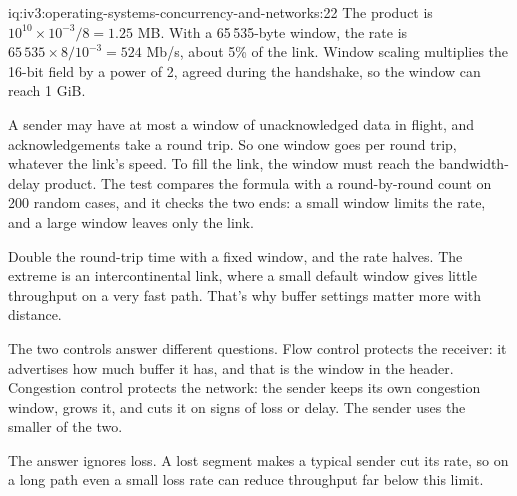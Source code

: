 \begin{solution}{iq:iv3:operating-systems-concurrency-and-networks:22}
The product is $10^{10} \times 10^{-3} / 8 = 1.25$ MB. With a 65\,535-byte window, the rate is $65\,535 \times 8 / 10^{-3} = 524$ Mb/s, about 5\% of the link. Window scaling multiplies the 16-bit field by a power of 2, agreed during the handshake, so the window can reach 1 GiB.
\label{lst:iv3:os:window}

A sender may have at most a window of unacknowledged data in flight, and acknowledgements take a round trip. So one window goes per round trip, whatever the link's speed. To fill the link, the window must reach the bandwidth-delay product. The test compares the formula with a round-by-round count on 200 random cases, and it checks the two ends: a small window limits the rate, and a large window leaves only the link.

Double the round-trip time with a fixed window, and the rate halves. The extreme is an intercontinental link, where a small default window gives little throughput on a very fast path. That's why buffer settings matter more with distance.

The two controls answer different questions. Flow control protects the receiver: it advertises how much buffer it has, and that is the window in the header. Congestion control protects the network: the sender keeps its own congestion window, grows it, and cuts it on signs of loss or delay. The sender uses the smaller of the two.

The answer ignores loss. A lost segment makes a typical sender cut its rate, so on a long path even a small loss rate can reduce throughput far below this limit.

\end{solution}

